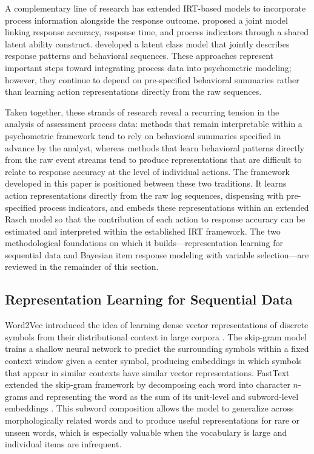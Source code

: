 \documentclass[A4paper,11pt]{article}
\begin{document}
A complementary line of research has extended IRT-based models to incorporate process information alongside the response outcome. \citet{he2019clustering} proposed a joint model linking response accuracy, response time, and process indicators through a shared latent ability construct. \citet{tang2020latent} developed a latent class model that jointly describes response patterns and behavioral sequences. These approaches represent important steps toward integrating process data into psychometric modeling; however, they continue to depend on pre-specified behavioral summaries rather than learning action representations directly from the raw sequences.

Taken together, these strands of research reveal a recurring tension in the analysis of assessment process data: methods that remain interpretable within a psychometric framework tend to rely on behavioral summaries specified in advance by the analyst, whereas methods that learn behavioral patterns directly from the raw event streams tend to produce representations that are difficult to relate to response accuracy at the level of individual actions. The framework developed in this paper is positioned between these two traditions. It learns action representations directly from the raw log sequences, dispensing with pre-specified process indicators, and embeds these representations within an extended Rasch model so that the contribution of each action to response accuracy can be estimated and interpreted within the established IRT framework. The two methodological foundations on which it builds---representation learning for sequential data and Bayesian item response modeling with variable selection---are reviewed in the remainder of this section.

\subsection{Representation Learning for Sequential Data}

Word2Vec introduced the idea of learning dense vector representations of discrete symbols from their distributional context in large corpora \citep{mikolov2013efficient, mikolov2013distributed}. The skip-gram model trains a shallow neural network to predict the surrounding symbols within a fixed context window given a center symbol, producing embeddings in which symbols that appear in similar contexts have similar vector representations. FastText extended the skip-gram framework by decomposing each word into character $n$-grams and representing the word as the sum of its unit-level and subword-level embeddings \citep{bojanowski2017enriching}. This subword composition allows the model to generalize across morphologically related words and to produce useful representations for rare or unseen words, which is especially valuable when the vocabulary is large and individual items are infrequent.
\end{document}
